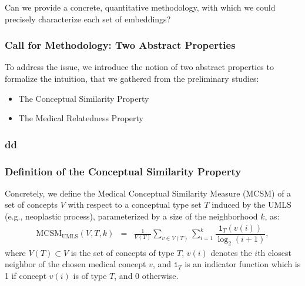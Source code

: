 \documentclass{beamer}
\begin{document}
\begin{frame}
\begin{center}
Can we provide a concrete, quantitative methodology,
with which we could precisely characterize each set of embeddings?
\end{center}
\end{frame}

\begin{frame}
\frametitle{Call for Methodology: Two Abstract 
Properties}
\begin{center}
To address the issue, we introduce the notion of
two abstract properties to formalize the
intuition, that we gathered from the preliminary 
studies:

\bigskip

\begin{itemize}
\item The Conceptual Similarity Property

\bigskip

\item The Medical Relatedness Property
\end{itemize}
\end{center}
\end{frame}

\begin{frame}
\frametitle{dd}
\end{frame}

\begin{frame}
\frametitle{Definition of the 
Conceptual Similarity Property}

Concretely, we define the Medical Conceptual Similarity Measure (MCSM) 
of a set of concepts $V$
with respect to a conceptual type set $T$ induced by the UMLS (e.g.,
neoplastic process), parameterized by 
a size of the neighborhood $k$, as: %
\begin{eqnarray*}
\text{MCSM}_{\text{UMLS}}(V,T,k) &=& \frac{1}{V(T)}\sum_{v \in V(T)} \sum_{i=1}^{k} \dfrac{ \mathtt{1}_{T}(v(i)) }{\log_2(i+1)},
\end{eqnarray*}
where $V(T)\subset V$ is the set of concepts of type $T$, $v(i)$ denotes the $i$th closest neighbor of the chosen medical concept $v$,
and $\mathtt{1}_{T}$ is an indicator function which is 1 if concept
$v(i)$ is of type $T$, and $0$ otherwise.
\end{frame}
\end{document}
